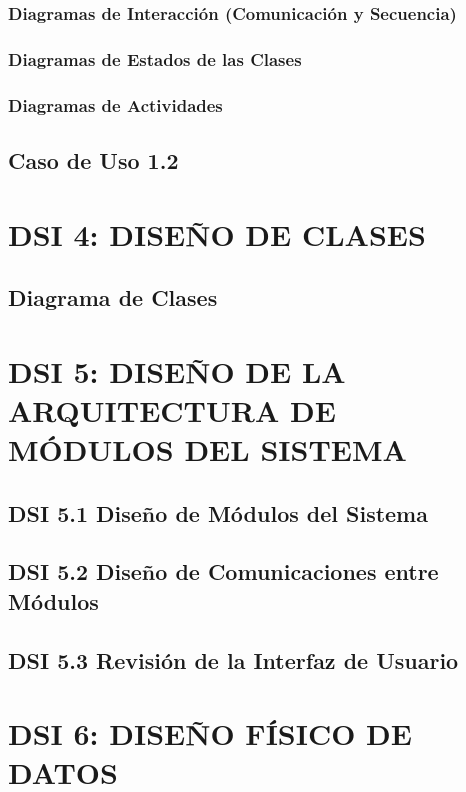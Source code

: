 \documentclass[11pt]{report}
\begin{document}
\subsubsection{Diagramas de Interacción (Comunicación y Secuencia)} 

\subsubsection{Diagramas de Estados de las Clases} 
 
\subsubsection{Diagramas de Actividades} 


\subsection{Caso de Uso 1.2}


\newpage
\section{DSI 4: DISEÑO DE CLASES}

\subsection{Diagrama de Clases}


\newpage
\section{DSI 5: DISEÑO DE LA ARQUITECTURA DE MÓDULOS DEL SISTEMA}

\subsection{DSI 5.1 Diseño de Módulos del Sistema}

\subsection{DSI 5.2 Diseño de Comunicaciones entre Módulos}

\subsection{DSI 5.3 Revisión de la Interfaz de Usuario}


\newpage
\section{DSI 6: DISEÑO FÍSICO DE DATOS}
\end{document}
